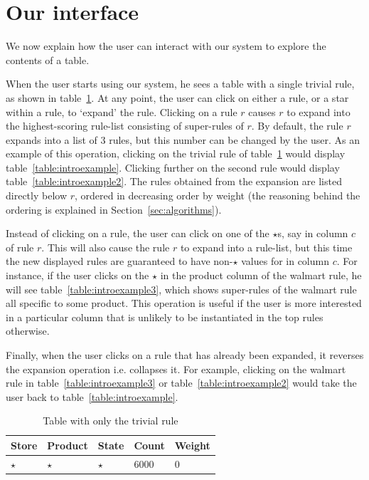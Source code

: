 \documentclass{sig-alternate}
\begin{document}
\section{Our interface}
\label{sec:interface}
We now explain how the user can interact with our system to explore the contents of a table. 

When the user starts using our system, he sees a table with a single trivial rule, as shown in table~\ref{table:trivial}. At any point, the user can click on either a rule, or a star within a rule, to `expand' the rule. Clicking on a rule $r$ causes $r$ to expand into the highest-scoring rule-list consisting of super-rules of $r$. By default, the rule $r$ expands into a list of $3$ rules, but this number can be changed by the user. As an example of this operation, clicking on the trivial rule of table~\ref{table:trivial} would display table~\ref{table:introexample}. Clicking further on the second rule would display table~\ref{table:introexample2}. The rules obtained from the expansion are listed directly below $r$, ordered in decreasing order by weight (the reasoning behind the ordering is explained in Section~\ref{sec:algorithms}).

Instead of clicking on a rule, the user can click on one of the $\star$s, say in column $c$ of rule $r$. This will also cause the rule $r$ to expand into a rule-list, but this time the new displayed rules are guaranteed to have non-$\star$ values for in column $c$. For instance, if the user clicks on the $\star$ in the product column of the walmart rule, he will see table~\ref{table:introexample3}, which shows super-rules of the walmart rule all specific to some product. This operation is useful if the user is more interested in a particular column that is unlikely to be instantiated in the top rules otherwise. 

Finally, when the user clicks on a rule that has already been expanded, it reverses the expansion operation i.e. collapses it. For example, clicking on the walmart rule in table~\ref{table:introexample3} or table~\ref{table:introexample2} would take the user back to table~\ref{table:introexample}.

\begin{table}
\centering
\begin{tabular}{| l | l | l | l | l |}
\hline Store & Product & State & Count & Weight \\
\hline
$\star$ & $\star$ & $\star$ & $6000$ & $0$ \\ \hline
\end{tabular}
\caption{Table with only the trivial rule \label{table:trivial}}
\end{table}
	
\end{document}
